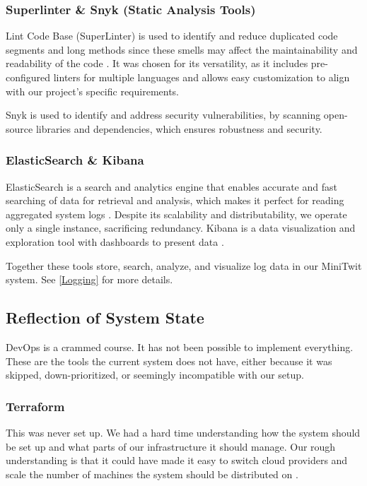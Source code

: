\subsubsection{Superlinter \& Snyk (Static Analysis Tools)}
Lint Code Base (SuperLinter) is used to identify and reduce duplicated code segments and long methods since these smells may affect the maintainability and readability of the code \autocite{superlinter, snyk}. It was chosen for its versatility, as it includes pre-configured linters for multiple languages and allows easy customization to align with our project's specific requirements.

Snyk is used to identify and address security vulnerabilities, by scanning open-source libraries and dependencies, which ensures robustness and security.

\subsubsection{ElasticSearch \& Kibana}
ElasticSearch is a search and analytics engine that enables accurate and fast searching of data for retrieval and analysis, which makes it perfect for reading aggregated system logs \autocite{elasticsearch}. Despite its scalability and distributability, we operate only a single instance, sacrificing redundancy. Kibana is a data visualization and exploration tool with dashboards to present data \autocite{kibana}. 

Together these tools store, search, analyze, and visualize log data in our MiniTwit system. See \ref{Logging} for more details.

\subsection{Reflection of System State}

DevOps is a crammed course. It has not been possible to implement everything. These are the tools the current system does not have, either because it was skipped, down-prioritized, or seemingly incompatible with our setup.  

\subsubsection{Terraform}
This was never set up. We had a hard time understanding how the system should be set up and what parts of our infrastructure it should manage. Our rough understanding is that it could have made it easy to switch cloud providers and scale the number of machines the system should be distributed on \autocite{terraform}. 

